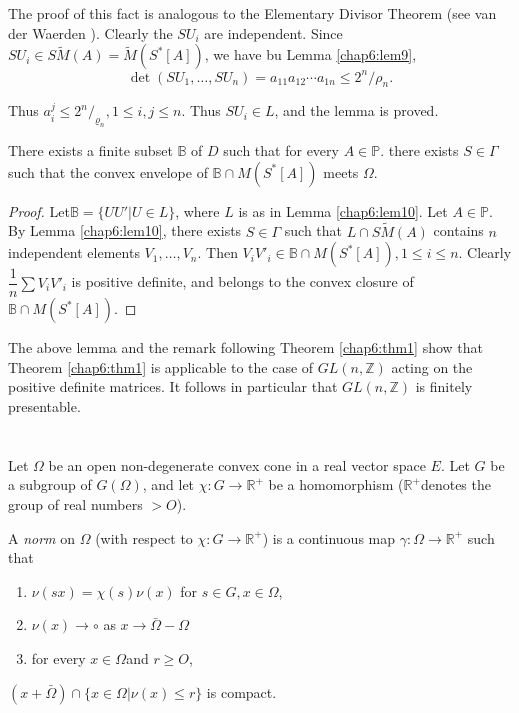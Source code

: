 The proof of this fact is analogous to the Elementary Divisor Theorem
(see van der Waerden \cite{key1}). Clearly the $SU_i$ are independent. Since
$SU_i \in S \tilde{M}(A)= \tilde{M}(S^* [A])$, we have bu Lemma \ref{chap6:lem9}, 
$$
\det (SU_1, \ldots , SU_n)=a_{11} a_{12} \cdots a_{1n} \leq 2^n/{\rho_n}.
$$

Thus $a^j_i \leq 2^n/_{\varrho_n}, 1 \leq i,j \leq n$. Thus $SU_i \in
L$, and the lemma is proved. 

\begin{lem}\label{chap6:lem11}%
  There exists a finite subset $\mathbb{B}$ of $D$ such that for every
  $A \in \mathbb{P}$. there exists $S \in \Gamma$ such that the convex
  envelope of $\mathbb{B}\cap M(S^*[A])$ meets $\Omega$. 
\end{lem}

\begin{proof}
  Let\pageoriginale $\mathbb{B}=\bigg \{ UU'|U \in L \bigg\}$, where $L$ is as in
  Lemma \ref{chap6:lem10}. Let $A \in \mathbb{P}$. By Lemma
  \ref{chap6:lem10}, there exists $S \in 
  \Gamma$ such that $L \cap S \tilde {M}(A)$ contains $n$ independent
  elements $V_1, \ldots,V_n$. Then $V_i V'_i \in \mathbb{B} \cap M(S^*
  [A]), 1 \leq i \leq n$.
  Clearly $\dfrac{1}{n} \sum V_i V'_i$ is positive definite, and belongs 
  to the convex closure of $\mathbb{B} \cap M(S^*[A])$. 
\end{proof}

\begin{remark*}
  The above lemma and the remark following Theorem \ref{chap6:thm1}
  show that Theorem \ref{chap6:thm1} is applicable to the case of
  $GL(n, \mathbb{Z})$  acting on the positive definite matrices. It
  follows in particular that $GL(n, \mathbb{Z})$ is finitely
  presentable.  
\end{remark*}

\section{}%

Let $\Omega$ be an open non-degenerate convex cone in a real vector
space $E$. Let $G$ be a subgroup of $G(\Omega)$, and let $\chi : G \to
\mathbb{R}^+$ be a homomorphism ($\mathbb{R}^+$denotes the group of
real numbers $> O$). 

\begin{defi*}
  A {\em norm} on $\Omega$ (with respect to $\chi : G \to \mathbb{R}^+$)
  is a continuous map $\gamma : \Omega \to \mathbb{R}^+$ such that 
  \begin{enumerate}[\rm (i)]
  \item $ \nu  (sx) = \chi (s)\nu (x)$ for $s \in G, x \in \Omega$,
  \item $\nu (x)\to \circ$ as $x \to \bar{\Omega}-\Omega$
  \item for every $x \in \Omega $and $r \geq O$,
  \end{enumerate}
  $(x +\bar{\Omega}) \cap \bigg \{ x \in \Omega | \nu (x) \leq r \bigg
  \}$ is compact. 
\end{defi*}

